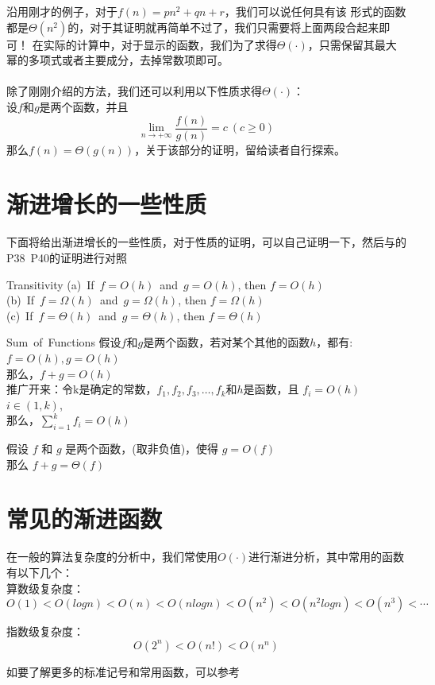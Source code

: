 沿用刚才的例子，对于$f(n)=pn^2+qn+r$，我们可以说任何具有该
形式的函数都是$\Theta(n^2)$的，对于其证明就再简单不过了，我们只需要将上面两段合起来即可！
在实际的计算中，对于显示的函数，我们为了求得$\Theta(\cdot)$，只需保留其最大幂的多项式或者主要成分，去掉常数项即可。
\\
\\
除了刚刚介绍的方法，我们还可以利用以下性质求得$\Theta(\cdot)$：
\\
设$f$和$g$是两个函数，并且
\[
   \lim_{n\rightarrow+\infty}\frac{f(n)}{g(n)} = c \ (c\ge 0)
\]
那么$f(n)=\Theta(g(n))$，关于该部分的证明，留给读者自行探索。


\section{渐进增长的一些性质}
下面将给出渐进增长的一些性质，对于性质的证明，可以自己证明一下，然后与\cite{textbook1}的P38~P40的证明进行对照
\begin{theorem}{Transitivity}{}
   (a)\ If\ $f=O(h)$\ and\ $g=O(h)$, then $f=O(h)$\\
   (b)\ If\ $f=\Omega(h)$\ and\ $g=\Omega(h)$, then $f=\Omega(h)$\\
   (c)\ If\ $f=\Theta(h)$\ and\ $g=\Theta(h)$, then $f=\Theta(h)$
\end{theorem}

\begin{theorem}{Sum\ of\ Functions}{}
   假设$f$和$g$是两个函数，若对某个其他的函数$h$，都有:$f=O(h),g=O(h)$\\
   那么，$f+g=O(h)$\\
   推广开来：令k是确定的常数，$f_1,f_2,f_3,\ldots,f_k$和$h$是函数，且
   $f_i=O(h)$ \ \ $i\in (1,k)$,\\
   那么，$\sum^{k}_{i=1}f_i=O(h)$
\end{theorem}

\begin{theorem}{ }{}
   假设 $f$ 和 $g$ 是两个函数，(取非负值)，使得 $g = O(f)$ \\
   那么 $f+g=\Theta(f)$
\end{theorem}

\section{常见的渐进函数}
在一般的算法复杂度的分析中，我们常使用$O(\cdot)$进行渐进分析，其中常用的函数有以下几个：\\
算数级复杂度：
\[
O(1)<O(logn)<O(n)<O(nlogn)<O(n^2)<O(n^2logn)<O(n^3)< \cdots
\]

指数级复杂度：
\[
O(2^n)<O(n!)<O(n^n)
\]

如要了解更多的标准记号和常用函数，可以参考~\cite{cormen2009introduction}
